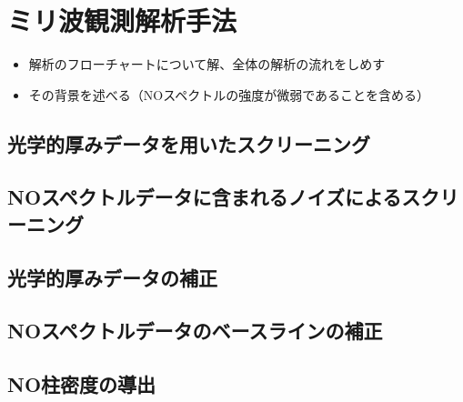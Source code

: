 \chapter{ミリ波観測解析手法}
\label{ch:mm_analysis}
\begin{itemize}
    \item 解析のフローチャートについて解、全体の解析の流れをしめす
    \item その背景を述べる（NOスペクトルの強度が微弱であることを含める）
\end{itemize}
\section{光学的厚みデータを用いたスクリーニング}
\label{sec:screening_opticaldepth}
\section{NOスペクトルデータに含まれるノイズによるスクリーニング}
\label{sec:screening_spectralnoise}
\section{光学的厚みデータの補正}
\label{sec:correction_opticaldepth}
\section{NOスペクトルデータのベースラインの補正}
\label{sec:correction_baselinefitting}
\section{NO柱密度の導出}
\label{sec:derive_columndensity}
